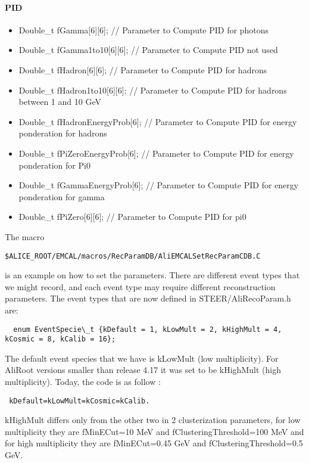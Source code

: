  \paragraph*{PID}
\begin{itemize}

  \item  Double\_t fGamma[6][6];              // Parameter to Compute PID for photons     

   \item Double\_t fGamma1to10[6][6];      // Parameter to Compute PID not used

  \item  Double\_t fHadron[6][6];               // Parameter to Compute PID for hadrons     

   \item Double\_t fHadron1to10[6][6];       // Parameter to Compute PID for hadrons between 1 and 10 GeV    

   \item Double\_t fHadronEnergyProb[6];   // Parameter to Compute PID for energy ponderation for hadrons          

   \item Double\_t fPiZeroEnergyProb[6];    // Parameter to Compute PID for energy ponderation for Pi0      

   \item Double\_t fGammaEnergyProb[6];  // Parameter to Compute PID for energy ponderation for gamma    

   \item Double\_t fPiZero[6][6];                // Parameter to Compute PID for pi0     
\end{itemize}

 

The macro 
\begin{lstlisting}
$ALICE_ROOT/EMCAL/macros/RecParamDB/AliEMCALSetRecParamCDB.C
\end{lstlisting} 
is an example on how to set the parameters. There are different event types that we might record, and each event type may require different reconstruction parameters. The event types that are now defined in STEER/AliRecoParam.h are:
\begin{lstlisting}
  enum EventSpecie\_t {kDefault = 1, kLowMult = 2, kHighMult = 4, kCosmic = 8, kCalib = 16};
\end{lstlisting} 


The default event species that we have is kLowMult (low multiplicity). For AliRoot versions smaller than release 4.17 it was set to be kHighMult (high multiplicity). Today, the code is as follow :
\begin{lstlisting}
 kDefault=kLowMult=kCosmic=kCalib.
 \end{lstlisting} 
 kHighMult differs only from the other two in 2 clusterization parameters, for low multiplicity they are fMinECut=10 MeV and fClusteringThreshold=100 MeV and for high multiplicity they are fMinECut=0.45 GeV and fClusteringThreshold=0.5 GeV.

